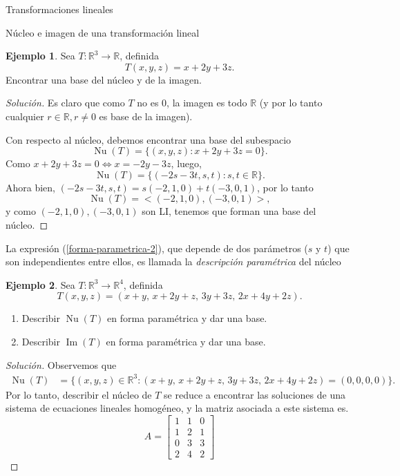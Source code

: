 \documentclass[a4paper,12pt,twoside,spanish,reqno]{amsbook}
\theoremstyle{definition}
\newtheorem{ejemplo}{Ejemplo}[section]
\theoremstyle{remark}
\newcommand{\img}{\operatorname{Im}}
\newcommand{\nuc}{\operatorname{Nu}}
\newcommand{\R}{\mathbb R}
\begin{document}
\begin{chapter}{Transformaciones lineales}
\begin{section}{Núcleo e imagen de una transformación lineal}
		\begin{ejemplo}
			Sea $T: \R^3 \to \R$, definida
			$$
			T(x,y,z) = x +2y +3z.
			$$
			Encontrar una base del núcleo y de la imagen.
			\begin{proof}[Solución]
				Es claro que como $T$ no es 0, la imagen es todo $\R$ (y por lo tanto cualquier $r\in \R, r \ne 0$ es base de la imagen). 
				
				Con respecto al núcleo,  debemos encontrar una base del subespacio
				$$
				\nuc(T) = \{(x,y,z): x+2y+3z =0\}.
				$$
				Como $x+2y+3z =0 \Leftrightarrow x = -2y-3z$, luego, 
				\begin{equation}\label{forma-parametrica-2}
					\nuc(T) =  \{(-2s-3t,s,t): s,t \in \R\}.
				\end{equation}
				Ahora bien, $(-2s-3t,s,t) = s(-2,1,0)+t(-3,0,1)$, por lo tanto 
				\begin{equation*}
				\nuc(T) =  <(-2,1,0),(-3,0,1)>,
				\end{equation*}
				y  como $(-2,1,0),(-3,0,1)$ son LI, tenemos que forman una base del núcleo. 
			\end{proof}
		
		La expresión (\ref{forma-parametrica-2}),  que depende de dos parámetros ($s$ y $t$) que son independientes entre ellos, es llamada la \textit{descripción paramétrica} del núcleo	
		\end{ejemplo}
		
		\begin{ejemplo}
		Sea $T: \R^3 \to \R^4$, definida
		$$
		T(x,y,z) = (x +y ,\,x +2y +z,\,3y +3z,\,2x +4y +2z).
		$$
		\begin{enumerate}
			\item Describir $\nuc(T)$  en forma paramétrica y dar una base.
			\item Describir $\img(T)$  en forma paramétrica y  dar una base. 
		\end{enumerate}
		\begin{proof}[Solución] 
		Observemos que 
		\begin{align*}
		\nuc(T) &= \{(x,y,z)\in \R^3: (x +y ,\,x +2y +z,\,3y +3z,\,2x +4y +2z) =(0,0,0,0)\}.
		\end{align*}
		Por  lo tanto, describir el núcleo de $T$ se reduce a encontrar las soluciones de una sistema de ecuaciones lineales homogéneo, y la matriz asociada a este sistema es.   
		\begin{equation*}
		A = \begin{bmatrix}
		1&1&0\\1&2&1\\0&3&3\\2&4&2
		\end{bmatrix}
		\end{equation*}
		

\end{proof}
\end{ejemplo}
\end{section}
\end{chapter}
\end{document}
